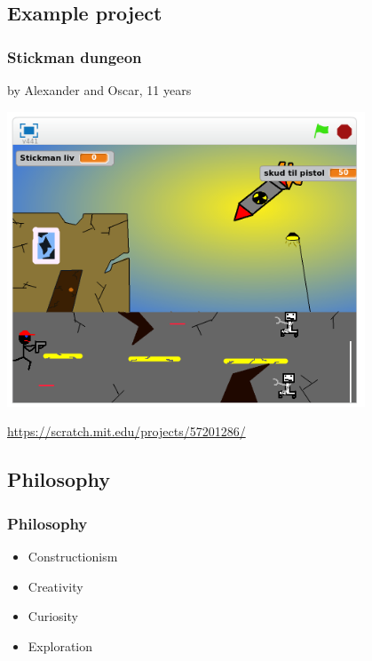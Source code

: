 \documentclass{beamer}
\begin{document}
\subsection{Example project}

\begin{frame}
  \frametitle{Stickman dungeon}
  by Alexander and Oscar, 11 years

  \centerline{\includegraphics[width=0.8\textwidth]{imagery/stickman-dungeon}}

  \url{https://scratch.mit.edu/projects/57201286/}
\end{frame}


\subsection{Philosophy}
\begin{frame}
\frametitle{Philosophy}

\begin{itemize}
\item Constructionism
\item Creativity
\item Curiosity
\item Exploration
\end{itemize}

\end{frame}



\end{document}
